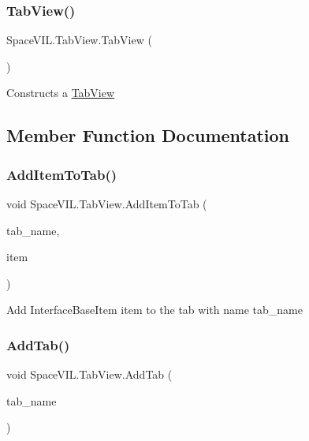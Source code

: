 \subsubsection{\texorpdfstring{Tab\+View()}{TabView()}}
{\footnotesize\ttfamily Space\+V\+I\+L.\+Tab\+View.\+Tab\+View (\begin{DoxyParamCaption}{ }\end{DoxyParamCaption})\hspace{0.3cm}{\ttfamily [inline]}}



Constructs a \mbox{\hyperlink{class_space_v_i_l_1_1_tab_view}{Tab\+View}} 



\subsection{Member Function Documentation}
\mbox{\label{class_space_v_i_l_1_1_tab_view_a1372d1fa43f967c2c7f8f5f11fa5b214}} 
\subsubsection{\texorpdfstring{Add\+Item\+To\+Tab()}{AddItemToTab()}}
{\footnotesize\ttfamily void Space\+V\+I\+L.\+Tab\+View.\+Add\+Item\+To\+Tab (\begin{DoxyParamCaption}\item[{String}]{tab\+\_\+name,  }\item[{\mbox{\hyperlink{interface_space_v_i_l_1_1_core_1_1_i_base_item}{I\+Base\+Item}}}]{item }\end{DoxyParamCaption})\hspace{0.3cm}{\ttfamily [inline]}}



Add Interface\+Base\+Item item to the tab with name tab\+\_\+name 

\mbox{\label{class_space_v_i_l_1_1_tab_view_a79d231232e2932821229e9837f5bf4f1}} 
\subsubsection{\texorpdfstring{Add\+Tab()}{AddTab()}\hspace{0.1cm}{\footnotesize\ttfamily [1/2]}}
{\footnotesize\ttfamily void Space\+V\+I\+L.\+Tab\+View.\+Add\+Tab (\begin{DoxyParamCaption}\item[{String}]{tab\+\_\+name }\end{DoxyParamCaption})\hspace{0.3cm}{\ttfamily [inline]}}



